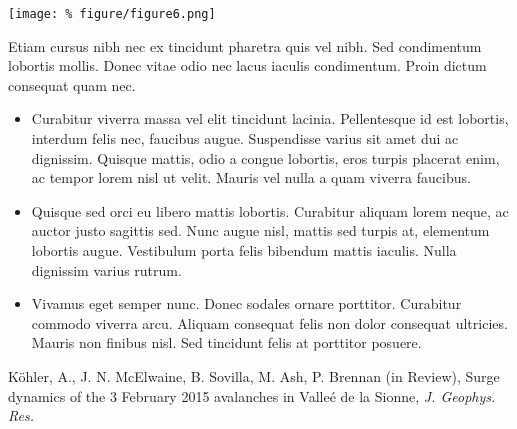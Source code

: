 \documentclass[unknownkeysallowed,usepdftitle=false, parskip=full]{beamer}
\newcommand{\secvariable}{nothing}
\newcommand{\mysection}[1]{\renewcommand{\secvariable}{#1}
}
\begin{document}
\mysection{slab}
\begin{frame}\label{\secvariable}
\begin{center}
\texttt{[image: \%
figure/figure6.png]}
\end{center}
    \parbox{\linewidth}{

Etiam cursus nibh nec ex tincidunt pharetra quis vel nibh. Sed condimentum lobortis mollis. Donec vitae odio nec lacus iaculis condimentum. Proin dictum consequat quam nec. }

\end{frame}


\mysection{conclusion}
\begin{frame}\label{\secvariable}
  
  \begin{itemize}
   \item Curabitur viverra massa vel elit tincidunt lacinia. Pellentesque id est lobortis, interdum felis nec, faucibus augue. Suspendisse varius sit amet dui ac dignissim. Quisque mattis, odio a congue lobortis, eros turpis placerat enim, ac tempor lorem nisl ut velit. Mauris vel nulla a quam viverra faucibus. 
  \item Quisque sed orci eu libero mattis lobortis. Curabitur aliquam lorem neque, ac auctor justo sagittis sed. Nunc augue nisl, mattis sed turpis at, elementum lobortis augue. Vestibulum porta felis bibendum mattis iaculis. Nulla dignissim varius rutrum.
  \item Vivamus eget semper nunc. Donec sodales ornare porttitor. Curabitur commodo viverra arcu. Aliquam consequat felis non dolor consequat ultricies. Mauris non finibus nisl. Sed tincidunt felis at porttitor posuere.

  \end{itemize}

  K\"ohler, A., J. N. McElwaine, B. Sovilla, M. Ash, P. Brennan (in Review),
Surge dynamics of the 3 February 2015 avalanches in Valle\'e de la Sionne,
\textit{J. Geophys. Res.} 
  
\end{frame}
\end{document}

